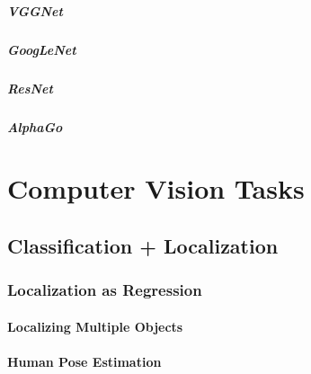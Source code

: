 			\paragraph{VGGNet} %

			\paragraph{GoogLeNet} %

			\paragraph{ResNet} %

			\paragraph{AlphaGo} %

\chapter{Computer Vision Tasks} %

	\section{Classification + Localization} %

		\subsection{Localization as Regression} %

			\subsubsection{Localizing Multiple Objects} %

			\subsubsection{Human Pose Estimation} %

